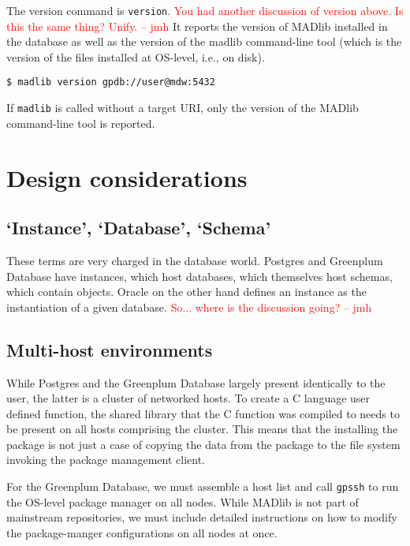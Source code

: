 \documentclass[11pt]{article}
\newcommand{\jmh}[1]{{\textcolor{red}{#1 -- jmh}}}
\begin{document}
{		The version command is \texttt{version}. \jmh{You had another discussion of version above.  Is this the same thing?  Unify.}  It reports the version of MADlib installed in the database as well as the version of the madlib command-line tool (which is the version of the files installed at OS-level, i.e., on disk).

		\begin{lstlisting}
$ madlib version gpdb://user@mdw:5432
		\end{lstlisting}
		
		If \texttt{madlib} is called without a target URI, only the version of the MADlib command-line tool is reported.

\ifx\pdfoutput\undefined %
\else
{}
\fi

\section{Design considerations}
	
	\subsection{`Instance', `Database', `Schema'}

	These terms are very charged in the database world. Postgres and Greenplum
	Database have instances, which host databases, which themselves host
	schemas, which contain objects. Oracle on the other hand defines an instance
	as the instantiation of a given database.  \jmh{So...  where is the discussion going?}

	\subsection{Multi-host environments}

	While Postgres and the Greenplum Database largely present identically to the
	user, the latter is a cluster of networked hosts. To create a C language
	user defined function, the shared library that the C function was compiled
	to needs to be present on all hosts comprising the cluster. This means that
	the installing the package is not just a case of copying the data from the
	package to the file system invoking the package management client.

	For the Greenplum Database, we must assemble a host list and
	call \texttt{gpssh} to run the OS-level package manager on all nodes. While MADlib is not part of mainstream repositories, we must include detailed instructions on how to modify the package-manger configurations on all nodes at once.

}
\end{document}
